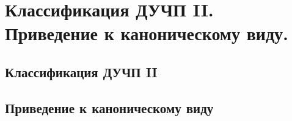 \chapter{Классификация ДУЧП II. Приведение к каноническому виду.}

\section{Классификация ДУЧП II}
\section{Приведение к каноническому виду}
\newpage
